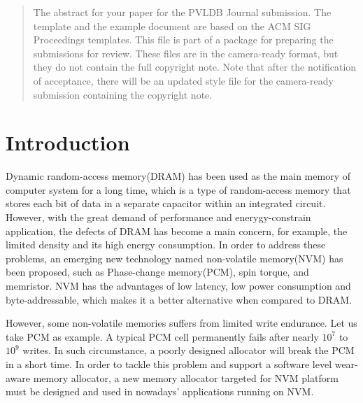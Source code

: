 \documentclass{vldb}
\begin{document}
\maketitle

\begin{abstract}
The abstract for your paper for the PVLDB Journal submission.
The template and the example document are based on the ACM SIG Proceedings  templates. This file is part of a package for preparing the submissions for review. These files are in the camera-ready format, but they do not contain the full copyright note.
Note that after the notification of acceptance, there will be an updated style file for the camera-ready submission containing the copyright note.
\end{abstract}



\section{Introduction}

Dynamic random-access memory(DRAM) has been used as the main memory of computer system for a long time, which is a type of random-access memory that stores each bit of data in a separate capacitor within an integrated circuit. 
However, with the great demand of performance and enerygy-constrain application, the defects of DRAM has become a main concern, for example, the limited density and its high energy consumption. 
In order to address these problems, an emerging new technology named non-volatile memory(NVM) has been proposed, such as Phase-change memory(PCM), spin torque, and memristor. 
NVM has the advantages of low latency, low power consumption and byte-addressable, which makes it a better alternative when compared  to DRAM.

However, some non-volatile memories suffers from limited write endurance. 
Let us take PCM as example. A typical PCM cell permanently fails after nearly $10^7$ to $10^9$ writes. 
In such circumstance, a poorly designed allocator will break the PCM in a short time. 
In order to tackle this problem and support a software level wear-aware memory allocator, a new memory allocator targeted for NVM platform must be designed and used in nowadays’ applications running on NVM.
\end{document}

